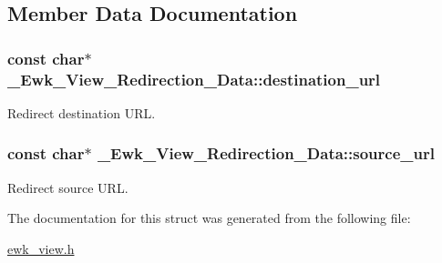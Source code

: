 \subsection{Member Data Documentation}
\hypertarget{struct__Ewk__View__Redirection__Data_a90bac80f79f3a7572b932a3662836663}{
\subsubsection[{destination\+\_\+url}]{\setlength{\rightskip}{0pt plus 5cm}const char$\ast$ \+\_\+\+Ewk\+\_\+\+View\+\_\+\+Redirection\+\_\+\+Data\+::destination\+\_\+url}}\label{struct__Ewk__View__Redirection__Data_a90bac80f79f3a7572b932a3662836663}
Redirect destination U\+R\+L. \hypertarget{struct__Ewk__View__Redirection__Data_a237691fabc93da92c8d7a3cfbf9a619a}{
\subsubsection[{source\+\_\+url}]{\setlength{\rightskip}{0pt plus 5cm}const char$\ast$ \+\_\+\+Ewk\+\_\+\+View\+\_\+\+Redirection\+\_\+\+Data\+::source\+\_\+url}}\label{struct__Ewk__View__Redirection__Data_a237691fabc93da92c8d7a3cfbf9a619a}
Redirect source U\+R\+L. 

The documentation for this struct was generated from the following file\+:\begin{DoxyCompactItemize}
\item 
\hyperlink{ewk__view_8h}{ewk\+\_\+view.\+h}\end{DoxyCompactItemize}
